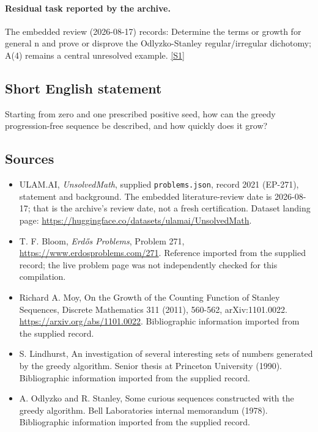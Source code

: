 \documentclass[11pt,a4paper]{article}
\newcommand{\sref}[2]{\hyperlink{source:#1:#2}{[S#2]}}
\begin{document}
\paragraph{Residual task reported by the archive.}

The embedded review (2026-08-17) records: Determine the terms or growth for general n and prove or disprove the Odlyzko-Stanley regular/irregular dichotomy; A(4) remains a central unresolved example. \sref{2021}{1}

\subsection{Short English statement}

Starting from zero and one prescribed positive seed, how can the greedy progression-free sequence be described, and how quickly does it grow?

\subsection{Sources}

{\small

\begin{itemize}

\item[\hypertarget{source:2021:1}{S1}] ULAM.AI, \emph{UnsolvedMath}, supplied \texttt{problems.json}, record 2021 (EP-271), statement and background. The embedded literature-review date is 2026-08-17; that is the archive’s review date, not a fresh certification. Dataset landing page: \url{https://huggingface.co/datasets/ulamai/UnsolvedMath}.

\item[\hypertarget{source:2021:2}{S2}] T. F. Bloom, \emph{Erdős Problems}, Problem 271, \url{https://www.erdosproblems.com/271}. Reference imported from the supplied record; the live problem page was not independently checked for this compilation.

\item[\hypertarget{source:2021:3}{S3}] Richard A. Moy, On the Growth of the Counting Function of Stanley Sequences, Discrete Mathematics 311 (2011), 560-562, arXiv:1101.0022. \url{https://arxiv.org/abs/1101.0022}. Bibliographic information imported from the supplied record.

\item[\hypertarget{source:2021:4}{S4}] S. Lindhurst, An investigation of several interesting sets of numbers generated by the greedy algorithm. Senior thesis at Princeton University (1990). Bibliographic information imported from the supplied record.

\item[\hypertarget{source:2021:5}{S5}] A. Odlyzko and R. Stanley, Some curious sequences constructed with the greedy algorithm. Bell Laboratories internal memorandum (1978). Bibliographic information imported from the supplied record.

\end{itemize}

}

\label{end:2021}
\end{document}
